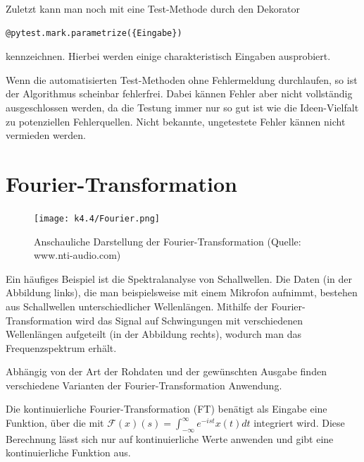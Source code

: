 \documentclass[]{dsadokumentation}
\begin{document}
Zuletzt kann man noch mit eine Test-Methode durch den Dekorator  
\begin{verbatim}
@pytest.mark.parametrize({Eingabe})
\end{verbatim}
 kennzeichnen. Hierbei werden einige charakteristisch Eingaben ausprobiert.

Wenn die automatisierten Test-Methoden ohne Fehlermeldung durchlaufen, so ist der Algorithmus scheinbar fehlerfrei. Dabei kännen Fehler aber nicht vollständig ausgeschlossen werden, da die Testung immer nur so gut ist wie die Ideen-Vielfalt zu potenziellen Fehlerquellen. Nicht bekannte, ungetestete Fehler kännen nicht vermieden werden.

\section{Fourier-Transformation}


\begin{figure}[h!]
	\centering
	\texttt{[image: k4.4/Fourier.png]}
	\caption{Anschauliche Darstellung der Fourier-Transformation (Quelle: www.nti-audio.com)}
\end{figure}

Ein häufiges Beispiel ist die Spektralanalyse von Schallwellen. Die Daten (in der Abbildung links), die man beispielsweise mit einem Mikrofon aufnimmt, bestehen aus Schallwellen unterschiedlicher Wellenlängen. Mithilfe der Fourier-Transformation wird das Signal auf Schwingungen mit verschiedenen Wellenl\"angen aufgeteilt (in der Abbildung rechts), wodurch man das Frequenzspektrum erhält.

Abhängig von der Art der Rohdaten und der gewünschten Ausgabe finden verschiedene Varianten der Fourier-Transformation Anwendung.

Die kontinuierliche Fourier-Transformation (FT) benätigt als Eingabe eine Funktion, über die mit $\mathcal{F}(x)(s)=\int_{-\infty}^{\infty}e^{-ist}x(t)dt$ integriert wird. Diese Berechnung lässt sich nur auf kontinuierliche Werte anwenden und gibt eine kontinuierliche Funktion aus.
\end{document}
